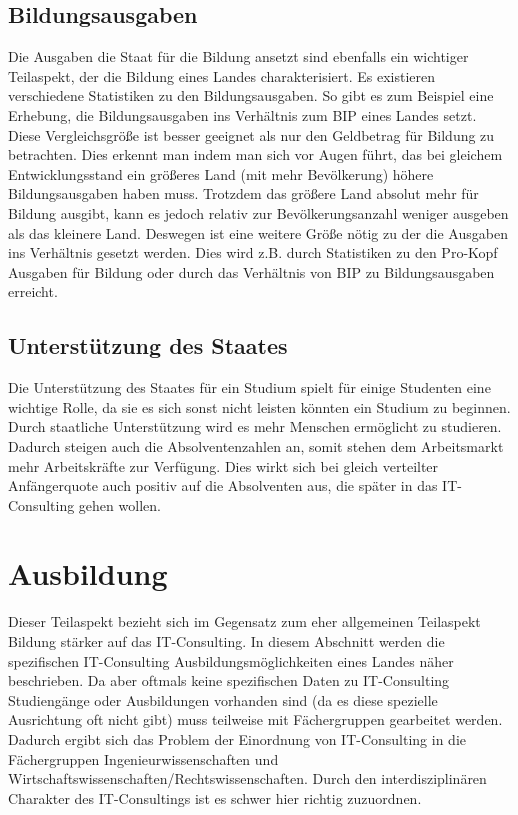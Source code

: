 \subsection{Bildungsausgaben}
Die Ausgaben die Staat für die Bildung ansetzt sind ebenfalls ein wichtiger Teilaspekt, der die Bildung eines Landes charakterisiert.
Es existieren verschiedene Statistiken zu den Bildungsausgaben. So gibt es zum Beispiel eine Erhebung, die Bildungsausgaben ins Verhältnis zum BIP eines Landes setzt\cite[6]{oecd2}. Diese Vergleichsgröße ist besser geeignet als nur den Geldbetrag für Bildung zu betrachten. Dies erkennt man indem man sich vor Augen führt, das bei gleichem Entwicklungsstand ein größeres Land (mit mehr Bevölkerung) höhere Bildungsausgaben haben muss. Trotzdem das größere Land absolut mehr für Bildung ausgibt, kann es jedoch relativ zur Bevölkerungsanzahl weniger ausgeben als das kleinere Land. Deswegen ist eine weitere Größe nötig zu der die Ausgaben ins Verhältnis gesetzt werden. Dies wird z.B. durch Statistiken zu den Pro-Kopf Ausgaben für Bildung \cite[4]{oecd2} oder durch das Verhältnis von BIP zu Bildungsausgaben erreicht.

\subsection{Unterstützung des Staates} 
Die Unterstützung des Staates für ein Studium spielt für einige Studenten eine wichtige Rolle, da sie es sich sonst nicht leisten könnten ein Studium zu beginnen. Durch staatliche Unterstützung wird es mehr Menschen ermöglicht zu studieren. Dadurch steigen auch die Absolventenzahlen an, somit stehen dem Arbeitsmarkt mehr Arbeitskräfte zur Verfügung. Dies wirkt sich bei gleich verteilter Anfängerquote auch positiv auf die Absolventen aus, die später in das IT-Consulting gehen wollen.

 \section{Ausbildung}
Dieser Teilaspekt bezieht sich im Gegensatz zum eher allgemeinen Teilaspekt Bildung stärker auf das IT-Consulting. In diesem Abschnitt werden die spezifischen IT-Consulting Ausbildungsmöglichkeiten eines Landes näher beschrieben.
Da aber oftmals keine spezifischen Daten zu IT-Consulting Studiengänge oder Ausbildungen vorhanden sind (da es diese spezielle Ausrichtung oft nicht gibt) muss teilweise mit Fächergruppen gearbeitet werden.
Dadurch ergibt sich das Problem der Einordnung von IT-Consulting in die Fächergruppen Ingenieurwissenschaften und Wirtschaftswissenschaften/Rechtswissenschaften. Durch den interdisziplinären Charakter des IT-Consultings ist es schwer hier richtig zuzuordnen.

